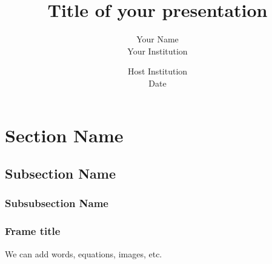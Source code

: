 \documentclass[xcolor=dvipsnames, aspectratio=1610]{beamer}
\title{\Large{Title of your presentation}}
\author{\large{\color{Black} Your Name} \\ \color{Black} Your Institution}
\date{\color{Black} Host Institution \\ \color{Black} Date}
\begin{document}

\begin{frame}

\titlepage 


\centering

\end{frame}






\section{Section Name}
\subsection{Subsection Name}
\subsubsection{Subsubsection Name}

\begin{frame}
\frametitle{Frame title}

We can add words, equations, images, etc.

\centering

\end{frame}

\end{document}
